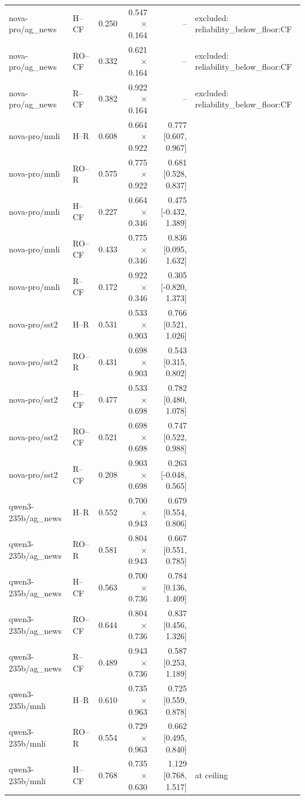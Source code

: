\begin{table}[t]
\begin{tabular}{llrrrl}
nova-pro/ag_news & H--CF & 0.250 & 0.547$\times$0.164 & -- & excluded: reliability\_below\_floor:CF \\
nova-pro/ag_news & RO--CF & 0.332 & 0.621$\times$0.164 & -- & excluded: reliability\_below\_floor:CF \\
nova-pro/ag_news & R--CF & 0.382 & 0.922$\times$0.164 & -- & excluded: reliability\_below\_floor:CF \\
nova-pro/mnli & H--R & 0.608 & 0.664$\times$0.922 & 0.777 [0.607, 0.967] &  \\
nova-pro/mnli & RO--R & 0.575 & 0.775$\times$0.922 & 0.681 [0.528, 0.837] &  \\
nova-pro/mnli & H--CF & 0.227 & 0.664$\times$0.346 & 0.475 [-0.432, 1.389] &  \\
nova-pro/mnli & RO--CF & 0.433 & 0.775$\times$0.346 & 0.836 [0.095, 1.632] &  \\
nova-pro/mnli & R--CF & 0.172 & 0.922$\times$0.346 & 0.305 [-0.820, 1.373] &  \\
nova-pro/sst2 & H--R & 0.531 & 0.533$\times$0.903 & 0.766 [0.521, 1.026] &  \\
nova-pro/sst2 & RO--R & 0.431 & 0.698$\times$0.903 & 0.543 [0.315, 0.802] &  \\
nova-pro/sst2 & H--CF & 0.477 & 0.533$\times$0.698 & 0.782 [0.480, 1.078] &  \\
nova-pro/sst2 & RO--CF & 0.521 & 0.698$\times$0.698 & 0.747 [0.522, 0.988] &  \\
nova-pro/sst2 & R--CF & 0.208 & 0.903$\times$0.698 & 0.263 [-0.048, 0.565] &  \\
qwen3-235b/ag_news & H--R & 0.552 & 0.700$\times$0.943 & 0.679 [0.554, 0.806] &  \\
qwen3-235b/ag_news & RO--R & 0.581 & 0.804$\times$0.943 & 0.667 [0.551, 0.785] &  \\
qwen3-235b/ag_news & H--CF & 0.563 & 0.700$\times$0.736 & 0.784 [0.136, 1.409] &  \\
qwen3-235b/ag_news & RO--CF & 0.644 & 0.804$\times$0.736 & 0.837 [0.456, 1.326] &  \\
qwen3-235b/ag_news & R--CF & 0.489 & 0.943$\times$0.736 & 0.587 [0.253, 1.189] &  \\
qwen3-235b/mnli & H--R & 0.610 & 0.735$\times$0.963 & 0.725 [0.559, 0.878] &  \\
qwen3-235b/mnli & RO--R & 0.554 & 0.729$\times$0.963 & 0.662 [0.495, 0.840] &  \\
qwen3-235b/mnli & H--CF & 0.768 & 0.735$\times$0.630 & 1.129 [0.768, 1.517] & at ceiling \\

\end{tabular}
\end{table}
